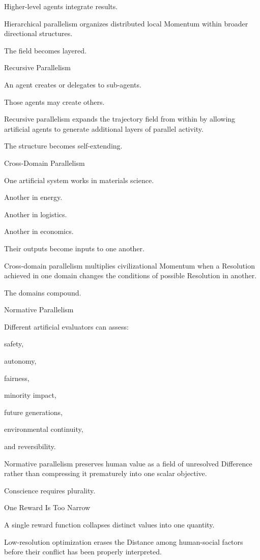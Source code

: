 Higher-level agents integrate results.

Hierarchical parallelism organizes distributed local Momentum within broader directional structures.

The field becomes layered.

Recursive Parallelism

An agent creates or delegates to sub-agents.

Those agents may create others.

Recursive parallelism expands the trajectory field from within by allowing artificial agents to generate additional layers of parallel activity.

The structure becomes self-extending.

Cross-Domain Parallelism

One artificial system works in materials science.

Another in energy.

Another in logistics.

Another in economics.

Their outputs become inputs to one another.

Cross-domain parallelism multiplies civilizational Momentum when a Resolution achieved in one domain changes the conditions of possible Resolution in another.

The domains compound.

Normative Parallelism

Different artificial evaluators can assess:

safety,

autonomy,

fairness,

minority impact,

future generations,

environmental continuity,

and reversibility.

Normative parallelism preserves human value as a field of unresolved Difference rather than compressing it prematurely into one scalar objective.

Conscience requires plurality.

One Reward Is Too Narrow

A single reward function collapses distinct values into one quantity.

Low-resolution optimization erases the Distance among human-social factors before their conflict has been properly interpreted.

